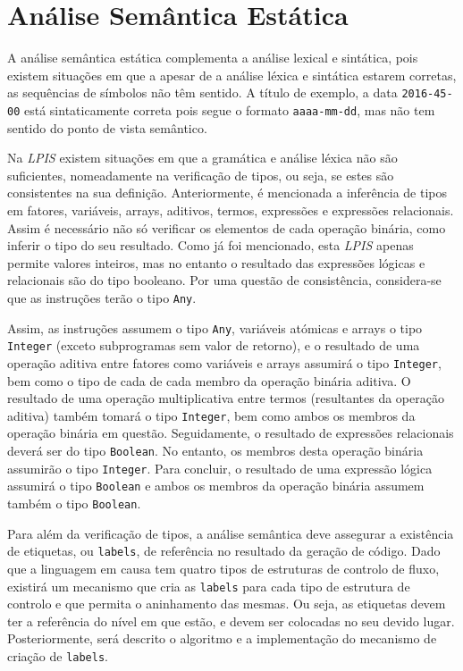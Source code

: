 \section{Análise Semântica Estática}
\label{subsec:semantica:desenho}

A análise semântica estática complementa a análise lexical e sintática, pois
existem situações em que a apesar de a análise léxica e sintática estarem
corretas, as sequências de símbolos não têm sentido. A título de exemplo, a data
\texttt{2016-45-00} está sintaticamente correta pois segue o formato
\texttt{aaaa-mm-dd}, mas não tem sentido do ponto de vista semântico.

Na \emph{LPIS} existem situações em que a gramática e análise léxica não são
suficientes, nomeadamente na verificação de tipos, ou seja, se estes são
consistentes na sua definição.  Anteriormente, é mencionada a inferência de
tipos em fatores, variáveis, arrays, aditivos, termos, expressões e expressões
relacionais. Assim é necessário não só verificar os elementos de cada operação
binária, como inferir o tipo do seu resultado.  Como já foi mencionado, esta
\emph{LPIS} apenas permite valores inteiros, mas no entanto o resultado das
expressões lógicas e relacionais são do tipo booleano. Por uma questão de
consistência, considera-se que as instruções terão o tipo \texttt{Any}.

Assim, as instruções assumem o tipo \texttt{Any}, variáveis atómicas e arrays
o tipo \texttt{Integer} (exceto subprogramas sem valor de retorno),
e o resultado de uma operação aditiva entre fatores como variáveis e arrays
assumirá o tipo \texttt{Integer}, bem como o tipo de cada de cada membro da
operação binária aditiva. O resultado de uma operação multiplicativa entre
termos (resultantes da operação aditiva) também tomará o tipo \texttt{Integer},
bem como ambos os membros da operação binária em questão. Seguidamente,
o resultado de expressões relacionais deverá ser do tipo \texttt{Boolean}. No
entanto, os membros desta operação binária assumirão o tipo \texttt{Integer}.
Para concluir, o resultado de uma expressão lógica assumirá o tipo
\texttt{Boolean} e ambos os membros da operação binária assumem também o tipo
\texttt{Boolean}.

Para além da verificação de tipos, a análise semântica deve assegurar
a existência de etiquetas, ou \texttt{labels}, de referência no resultado da
geração de código. Dado que a linguagem em causa tem quatro tipos de estruturas
de controlo de fluxo, existirá um mecanismo que cria as \texttt{labels} para
cada tipo de estrutura de controlo e que permita o aninhamento das mesmas. Ou
seja, as etiquetas devem ter a referência do nível em que estão, e devem ser
colocadas no seu devido lugar.  Posteriormente, será descrito o algoritmo
e a implementação do mecanismo de criação de \texttt{labels}.

